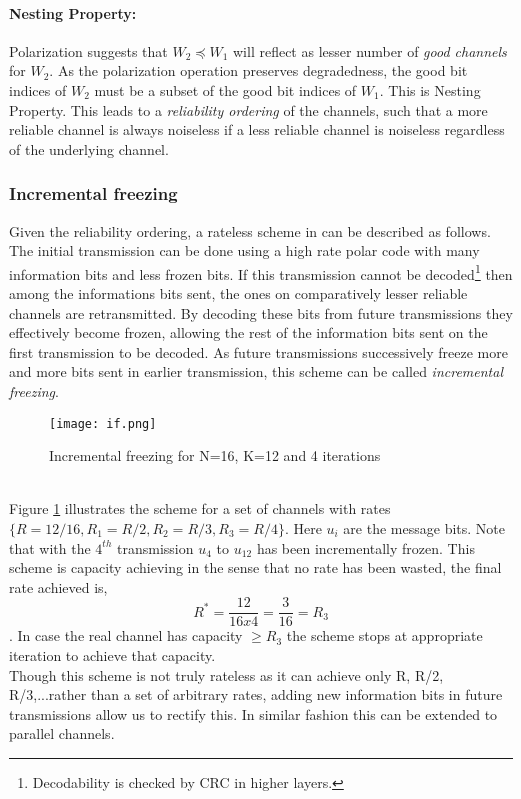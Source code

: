 \documentclass[
11pt, %
a4paper, %
oneside, %
headinclude,footinclude, %
BCOR5mm, %
]{scrartcl}
\begin{document}
\paragraph{Nesting Property:}Polarization suggests that $W_2 \preceq W_1$ will reflect as lesser number of \emph{good channels} for $W_2$. As the polarization operation preserves degradedness\cite{wang}, the good bit indices of $W_2$ must be a subset of the good bit indices of $W_1$. This is Nesting Property. This leads to a \emph{reliability ordering} of the channels, such that a more reliable channel is always noiseless if a less reliable channel is noiseless regardless of the underlying channel.
\subsubsection{Incremental freezing}\label{if}
Given the reliability ordering, a rateless scheme in \cite{chen} can be described as follows. The initial transmission can be done using a high rate polar code with many information bits and less frozen bits. If this transmission cannot be decoded\footnote{Decodability is checked by CRC in higher layers.} then among the informations bits sent, the ones on comparatively lesser reliable channels are retransmitted. By decoding these bits from future transmissions they effectively become frozen, allowing the rest of the information bits sent on the first transmission to be decoded.  As future transmissions successively freeze more and more bits sent in earlier transmission, this scheme can be called \emph{incremental freezing}.
\begin{figure}[h]
 \begin{center}
    \texttt{[image: if.png]}
  \end{center}
  \caption{Incremental freezing for N=16, K=12 and 4 iterations}
  \label{fig:if}
\end{figure}  
\\Figure \ref{fig:if} illustrates the scheme for a set of channels with rates $\{ R=12/16, R_1= R/2,R_2= R/3,R_3= R/4\}$. Here $u_i$ are the message bits. Note that with the $4^{th}$ transmission  $u_4$ to $u_{12}$ has been incrementally frozen. This scheme is capacity achieving in the sense that no rate has been wasted, the final rate achieved is, $$R^*= \frac{12}{16x4}=\frac{3}{16}=R_3 $$. In case the real channel has capacity $ \geq R_3$ the scheme stops at appropriate iteration to achieve that capacity.\\
Though this scheme is not truly rateless as it can achieve only R, R/2, R/3,...rather than a set of arbitrary rates, adding new information bits in future transmissions allow us to rectify this. In similar fashion this can be extended to parallel channels.\\
\end{document}
